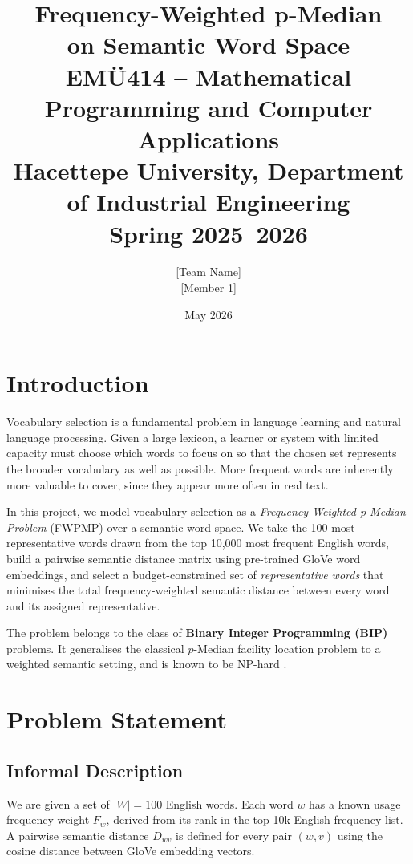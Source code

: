 \documentclass[11pt]{article}
\title{\textbf{Frequency-Weighted p-Median\\
       on Semantic Word Space}\\[6pt]
       {\large EMÜ414 -- Mathematical Programming and Computer Applications\\
        Hacettepe University, Department of Industrial Engineering\\
        Spring 2025--2026}}
\author{[Team Name]\\[4pt]
        [Member 1] \quad [Member 2] \quad [Member 3]\\
        [Member 4] \quad [Member 5] \quad [Member 6]}
\date{May 2026}
\begin{document}
\maketitle

\section{Introduction}

Vocabulary selection is a fundamental problem in language learning and natural language
processing. Given a large lexicon, a learner or system with limited capacity must choose
which words to focus on so that the chosen set represents the broader vocabulary as well
as possible. More frequent words are inherently more valuable to cover, since they appear
more often in real text.

In this project, we model vocabulary selection as a \textit{Frequency-Weighted p-Median Problem} (FWPMP) over a semantic word space. We take the 100 most
representative words drawn from the top 10{,}000 most frequent English words, build a
pairwise semantic distance matrix using pre-trained GloVe word embeddings, and select
a budget-constrained set of \emph{representative words} that minimises the total
frequency-weighted semantic distance between every word and its assigned representative.

The problem belongs to the class of \textbf{Binary Integer Programming (BIP)} problems.
It generalises the classical $p$-Median facility location problem to a weighted semantic
setting, and is known to be NP-hard \citep{hochbaum1997}.

\section{Problem Statement}\label{sec:problem}

\subsection{Informal Description}

We are given a set of $|W| = 100$ English words. Each word $w$ has a known usage
frequency weight $F_w$, derived from its rank in the top-10k English frequency list.
A pairwise semantic distance $D_{wv}$ is defined for every pair $(w, v)$ using the
cosine distance between GloVe embedding vectors.
\end{document}
